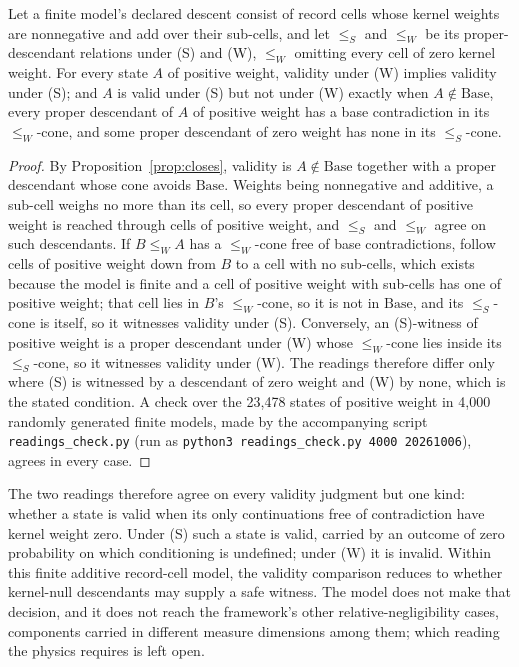\begin{proposition}\label{prop:readings}
Let a finite model's declared descent consist of record cells whose kernel weights are nonnegative and add over their sub-cells, and let $\le_S$ and $\le_W$ be its proper-descendant relations under (S) and (W), $\le_W$ omitting every cell of zero kernel weight. For every state $A$ of positive weight, validity under (W) implies validity under (S); and $A$ is valid under (S) but not under (W) exactly when $A \notin \mathrm{Base}$, every proper descendant of $A$ of positive weight has a base contradiction in its $\le_W$-cone, and some proper descendant of zero weight has none in its $\le_S$-cone.
\end{proposition}
\begin{proof}
By Proposition~\ref{prop:closes}, validity is $A \notin \mathrm{Base}$ together with a proper descendant whose cone avoids $\mathrm{Base}$. Weights being nonnegative and additive, a sub-cell weighs no more than its cell, so every proper descendant of positive weight is reached through cells of positive weight, and $\le_S$ and $\le_W$ agree on such descendants. If $B \le_W A$ has a $\le_W$-cone free of base contradictions, follow cells of positive weight down from $B$ to a cell with no sub-cells, which exists because the model is finite and a cell of positive weight with sub-cells has one of positive weight; that cell lies in $B$'s $\le_W$-cone, so it is not in $\mathrm{Base}$, and its $\le_S$-cone is itself, so it witnesses validity under (S). Conversely, an (S)-witness of positive weight is a proper descendant under (W) whose $\le_W$-cone lies inside its $\le_S$-cone, so it witnesses validity under (W). The readings therefore differ only where (S) is witnessed by a descendant of zero weight and (W) by none, which is the stated condition. A check over the 23{,}478 states of positive weight in 4{,}000 randomly generated finite models, made by the accompanying script \texttt{readings\_check.py} (run as \texttt{python3 readings\_check.py 4000 20261006}), agrees in every case.
\end{proof}

\noindent The two readings therefore agree on every validity judgment but one kind: whether a state is valid when its only continuations free of contradiction have kernel weight zero. Under (S) such a state is valid, carried by an outcome of zero probability on which conditioning is undefined; under (W) it is invalid. Within this finite additive record-cell model, the validity comparison reduces to whether kernel-null descendants may supply a safe witness. The model does not make that decision, and it does not reach the framework's other relative-negligibility cases, components carried in different measure dimensions among them; which reading the physics requires is left open.

\printbibliography

